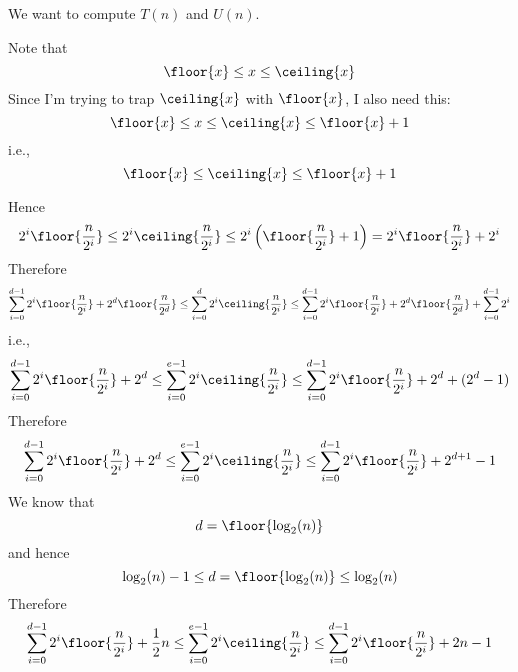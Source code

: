 We want to compute $T(n)$ and $U(n)$.

Note that
\[
\floor{x} \leq x \leq \ceiling{x}
\]
Since I'm trying to trap $\ceiling{x}$ with $\floor{x}$, 
I also need this:
\[
\floor{x} \leq x \leq \ceiling{x} \leq \floor{x} + 1
\]
i.e.,
\[
\floor{x} \leq \ceiling{x} \leq \floor{x} + 1
\]

Hence
\[
2^i \floor{\frac{n}{2^i}}
\leq
2^i \ceiling{\frac{n}{2^i}}
\leq
2^i  \left( \floor{\frac{n}{2^i}} + 1 \right)
= 
2^i  \floor{\frac{n}{2^i}} + 2^i
\]
Therefore
\[
\sum_{i=0}^{d - 1} 2^i \floor{\frac{n}{2^i}} + 2^d \floor{\frac{n}{2^d}}
\leq
\sum_{i=0}^{d} 2^i \ceiling{\frac{n}{2^i}}
\leq
\sum_{i=0}^{d - 1} 2^i  \floor{\frac{n}{2^i}} + 2^d \floor{\frac{n}{2^d}}
+ \sum_{i=0}^{d - 1} 2^i
\]
i.e.,
\[
\sum_{i=0}^{d - 1} 2^i \floor{\frac{n}{2^i}} + 2^d 
\leq
\sum_{i=0}^{e - 1} 2^i \ceiling{\frac{n}{2^i}}
\leq
\sum_{i=0}^{d - 1} 2^i  \floor{\frac{n}{2^i}} + 2^d 
+ (2^d - 1)
\]
Therefore
\[
\sum_{i=0}^{d - 1} 2^i \floor{\frac{n}{2^i}} + 2^d 
\leq
\sum_{i=0}^{e - 1} 2^i \ceiling{\frac{n}{2^i}}
\leq
\sum_{i=0}^{d - 1} 2^i  \floor{\frac{n}{2^i}} + 2^{d+1} - 1
\]
We know that
\[
d = \floor{\log_2(n)}
\]
and hence
\[
\log_2(n) - 1 \leq d = \floor{\log_2(n)} \leq \log_2(n)
\]
Therefore
\[
\sum_{i=0}^{d - 1} 2^i \floor{\frac{n}{2^i}} + \frac{1}{2} n
\leq
\sum_{i=0}^{e - 1} 2^i \ceiling{\frac{n}{2^i}}
\leq
\sum_{i=0}^{d - 1} 2^i  \floor{\frac{n}{2^i}} + 2 n - 1
\]


